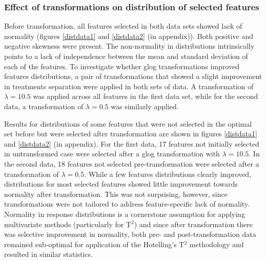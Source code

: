 \documentclass[11pt]{article}
\begin{document}
\subsubsection*{Effect of transformations on distribution of selected features}
\par{Before transformation, all features selected in both data sets showed lack of normality (figures \ref{distdata1} and \ref{distdata2} (in appendix)). Both positive and negative skewness were present. The non-normality in distributions intrinsically points to a lack of independence between the mean and standard deviation of each of the features. To investigate whether glog transformations improved features distributions, a pair of transformations that showed a slight improvement in treatments separation were applied in both sets of data. A transformation of $\lambda = 10.5$ was applied across all features in the first data set, while for the second data, a transformation of  $\lambda = 0.5$ was similarly applied.}
\par{Results for distributions of some features that were not selected in the optimal set before but were selected after transformation are shown in figures \ref{distdata1} and \ref{distdata2} (in appendix). For the first data, 17 features not initially selected in untransformed case were selected after a glog transformation with $\lambda = 10.5$. In the second data, 18 features not selected pre-transformation were selected after a transformation of $\lambda = 0.5$. While a few features distributions clearly improved, distributions for most selected features showed little improvement towards normality after transformation. This was not surprising, however, since transformations were not tailored to address feature-specific lack of normality. Normality in response distributions is a cornerstone assumption for applying multivariate methods (particularly for T$^2$) and since after transformation there was selective improvement in normality, both pre- and post-transformation data remained sub-optimal for application of the Hotelling's T$^2$ methodology and resulted in similar statistics.}
\end{document}
